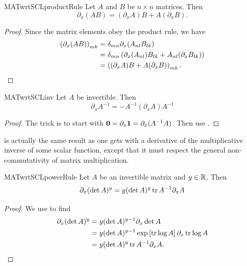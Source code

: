 \begin{proposition}{}{MATwrtSCLproductRule}
  Let $A$ and $B$ be $n\times n$ matrices. Then
  $$
    \partial_x(AB)=(\partial_x A)B+A(\partial_x B).
  $$
  \begin{proof}
    Since the matrix elements obey the product
    rule, we have
    \begin{equation*}
      \begin{aligned}
        \left(\partial_x(AB)\right)_{mk}
          &=\delta_{mn}\partial_x(A_{nl}B_{lk})\\
          &=\delta_{mn}\left(\partial_x(A_{nl})B_{lk}
                            +A_{nl}(\partial_x B_{lk})\right)\\
          &=\left((\partial_x A)B+A(\partial_x B)\right)_{mk}.
      \end{aligned}
    \end{equation*}
  \end{proof}
\end{proposition}

\begin{proposition}{}{MATwrtSCLinv}
Let $A$ be invertible. Then
$$
\partial_x A^{-1}=-A^{-1}\left(\partial_x A \right)A^{-1}
$$
\begin{proof}
The trick is to start with ${\mathbf 0}=\partial_x{\mathbf 1}=\partial_x(A^{-1}A)$.
Then use . 
\end{proof}
\end{proposition}
 is actually
the same result as one gets with a derivative of the multiplicative
inverse of some scalar function, except that it must respect
 the general non-commutativity of matrix multiplication.

\begin{proposition}{}{MATwrtSCLpowerRule}
Let $A$ be an invertible matrix and $y\in\mathbb{R}$. Then
$$
\partial_x(\det A)^y=
y(\det A)^y \tr A^{-1}\partial_x A
$$ 
\begin{proof}
We use  to find
\begin{equation*}\begin{aligned}
  \partial_x(\det A)^y &= y(\det A)^{y-1}\partial_x\det A\\
      &= y(\det A)^{y-1}\exp\left[\tr\log A\right]\partial_x\tr\log A\\
      &= y(\det A)^y \tr A^{-1}\partial_x A.
\end{aligned}\end{equation*}
\end{proof}
\end{proposition}

